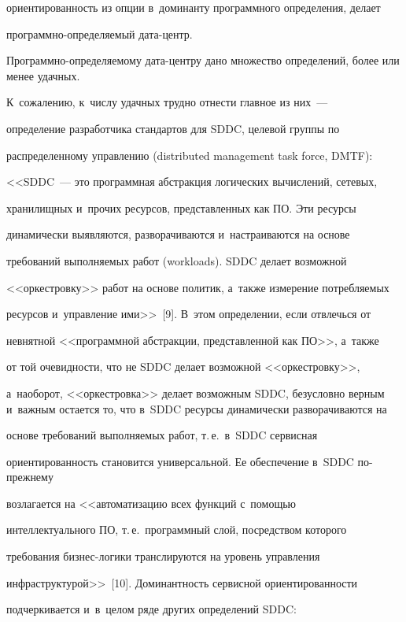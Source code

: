 ориентированность из опции в~доминанту программного определения, делает 


программно-определяемый да\-та-центр.


    


    Программно-определяемому дата-цент\-ру дано множество определений, более или менее удачных. 


К~сожалению, к~числу удачных трудно отнести главное из них~--- 


определение разработчика стандартов для \mbox{SDDC}, целевой группы по 


распределенному управ\-ле\-нию (distributed management task force, DMTF): 


<<\mbox{SDDC}~--- это программная абстракция логических вы\-чис\-ле\-ний, сетевых, 


хранилищных и~прочих ресурсов, пред\-став\-лен\-ных как ПО. Эти ресурсы 


динамически выявляются, разворачиваются и~настраиваются на основе 


требований вы\-пол\-ня\-емых работ (workloads). SDDC делает возможной 


<<оркестровку>> работ на основе политик, а~также измерение потребляемых 


ресурсов и~управление ими>>~[9]. В~этом определении, если отвлечься от 


невнятной <<программной абстракции, представленной как ПО>>, а~также 


от той очевидности, что не SDDC делает возможной <<оркестровку>>, 


а~наоборот, <<оркестровка>> делает возможным SDDC, безусловно вер\-ным и~важ\-ным остается то, что в~SDDC ресурсы динамически разворачиваются на 


основе требований выполняемых работ, т.\,е.\ в~SDDC сервисная 


ориентированность становится универсальной. Ее обеспечение в~SDDC по-преж\-не\-му 


возлагается на <<автоматизацию всех функций с~по\-мощью 


интеллектуального ПО, т.\,е.\ программный слой, посредством которого 


требования биз\-нес-ло\-ги\-ки транслируются на уровень управ\-ле\-ния 


инфраструктурой>>~[10]. Доминантность сервисной ори\-ен\-ти\-ро\-ван\-ности 


подчеркивается и~в~целом ряде других определений SDDC:


